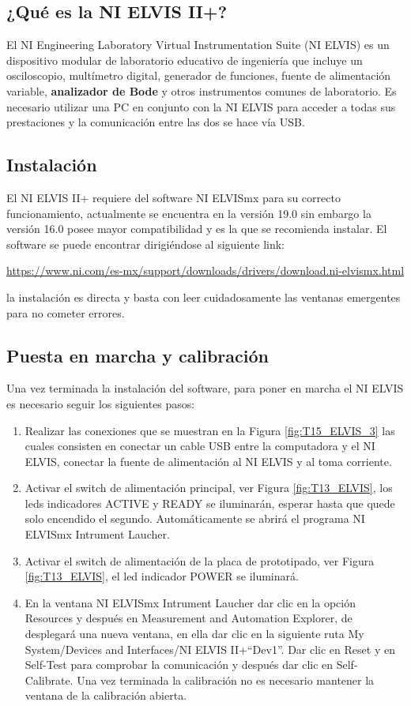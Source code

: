 		\subsection{¿Qué es la NI ELVIS II+?}
	El NI Engineering Laboratory Virtual Instrumentation Suite (NI ELVIS) es un dispositivo modular de laboratorio educativo de ingeniería que incluye un osciloscopio, multímetro digital, generador de funciones, fuente de alimentación variable, \textbf{analizador de Bode} y otros instrumentos comunes de laboratorio. Es necesario utilizar una PC en conjunto con la NI ELVIS para acceder a todas sus prestaciones y la comunicación entre las dos se hace vía USB.

		\subsection{Instalación}

	El NI ELVIS II+ requiere del software NI ELVISmx para su correcto funcionamiento, actualmente se encuentra en la versión 19.0 sin embargo la versión 16.0 posee mayor compatibilidad y es la que se recomienda instalar. El software se puede encontrar dirigiéndose al siguiente link:  

	\begin{center}
		\url{https://www.ni.com/es-mx/support/downloads/drivers/download.ni-elvismx.html}
	\end{center}
	la instalación es directa y basta con leer cuidadosamente las ventanas emergentes para no cometer errores.
		
		\subsection{Puesta en marcha y calibración}

	Una vez terminada la instalación del software, para poner en marcha el NI ELVIS es necesario seguir los siguientes pasos:
	\begin{enumerate}
		\item Realizar las conexiones que se muestran en la Figura \ref{fig:T15_ELVIS_3} las cuales consisten en conectar un cable USB entre la computadora y el NI ELVIS, conectar la fuente de alimentación al NI ELVIS y al toma corriente.
		\item Activar el switch de alimentación principal, ver Figura \ref{fig:T13_ELVIS}, los leds indicadores ACTIVE y READY se iluminarán, esperar hasta que quede solo encendido el segundo. Automáticamente se abrirá el programa NI ELVISmx Intrument Laucher.
		\item Activar el switch de alimentación de la placa de prototipado, ver Figura \ref{fig:T13_ELVIS}, el led indicador POWER se iluminará.
		\item En la ventana NI ELVISmx Intrument Laucher dar clic en la opción Resources y después en Measurement and Automation Explorer, de desplegará una nueva ventana, en ella dar clic en la siguiente ruta My System/Devices and Interfaces/NI ELVIS II+``Dev1''. Dar clic en Reset y en Self-Test para comprobar la comunicación y después dar clic en Self-Calibrate. Una vez terminada la calibración no es necesario mantener la ventana de la calibración abierta.
	\end{enumerate}		
	
